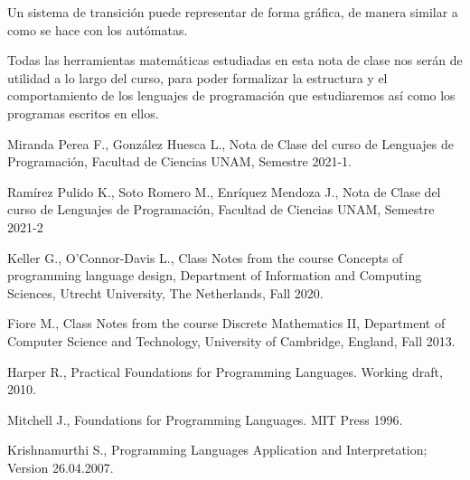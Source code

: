 \documentclass[12pt]{extarticle}
\begin{document}
\begin{example}
Un sistema de transición puede representar de forma gráfica, de manera similar a como se hace con los autómatas.

    \begin{center}
    \end{center}

\end{example}

\vspace{3em}

Todas las herramientas matemáticas estudiadas en esta nota de clase nos serán de utilidad a lo largo del curso, para poder formalizar la estructura y el comportamiento de los lenguajes de programación que estudiaremos así como los programas escritos en ellos.


\begin{thebibliography}{9}

Miranda Perea F., González Huesca L., Nota de Clase del curso de Lenguajes de Programación, Facultad de Ciencias UNAM, Semestre 2021-1.

Ramírez Pulido K., Soto Romero M., Enríquez Mendoza J., Nota de Clase del curso de Lenguajes de Programación, Facultad de Ciencias UNAM, Semestre 2021-2

Keller G., O'Connor-Davis L., Class Notes from the course Concepts of programming language design, Department of Information and Computing Sciences, Utrecht University, The Netherlands, Fall 2020.

Fiore M., Class Notes from the course Discrete Mathematics II, Department of Computer Science and Technology, University of Cambridge, England, Fall 2013.

Harper R., Practical Foundations for Programming Languages. Working draft, 2010.

Mitchell J., Foundations for Programming Languages. MIT Press 1996.

Krishnamurthi S., Programming Languages Application and Interpretation; Version 26.04.2007.


\end{thebibliography}
\end{document}
